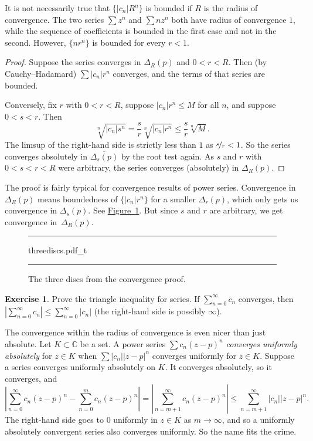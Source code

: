 \documentclass[12pt,openany]{book}
\newcommand{\sabs}[1]{\lvert {#1} \rvert}
\newcommand{\abs}[1]{\left\lvert {#1} \right\rvert}
\newcommand{\C}{{\mathbb{C}}}
\theoremstyle{plain}
\theoremstyle{remark}
\theoremstyle{definition}
\newenvironment{exbox}{%
    \def\FrameCommand{\vrule width 1pt \relax\hspace{10pt}}%
    \MakeFramed{\advance\hsize-\width\FrameRestore}%
}{%
    \endMakeFramed
}
\newenvironment{myfig}{%
\begin{figure}[h!t]
\noindent\rule{\textwidth}{0.5pt}\vspace{12pt}\par\centering}%
{\par\noindent\rule{\textwidth}{0.5pt}
\end{figure}}
\theoremstyle{exercise}
\newtheorem{exercise}{Exercise}[section]
\theoremstyle{example}
\newcommand{\figureref}[1]{\hyperref[#1]{Figure~\ref*{#1}}}
\begin{document}
It is not necessarily true that $\bigl\{ \sabs{c_n} R^n \bigr\}$
is bounded if $R$ is the radius of convergence.
The two series $\sum z^n$ and $\sum n z^n$ both have
radius of convergence $1$, while the sequence of coefficients
is bounded in the first case and
not in the second.  However, $\{ n r^n \}$ is bounded for every $r < 1$.

\begin{proof}
Suppose the series converges in $\Delta_{R}(p)$ and
$0 < r < R$.  Then (by Cauchy--Hadamard) $\sum \sabs{c_n}r^n$ converges,
and the terms of that series are bounded.

Conversely, fix $r$ with $0 < r < R$, suppose 
$\sabs{c_n} r^n \leq M$ for all $n$, and suppose $0 < s < r$.
Then
\begin{equation*}
\sqrt[n]{\sabs{c_n} s^n}=
\frac{s}{r}\sqrt[n]{\sabs{c_n} r^n} \leq \frac{s}{r} \sqrt[n]{M} .
\end{equation*}
The limsup of the right-hand side is strictly less than $1$
as $\nicefrac{s}{r} < 1$.
So the series converges absolutely in
$\overline{\Delta_s(p)}$ by the root test again.
As $s$ and $r$ with $0 < s < r < R$ were arbitrary,
the series converges (absolutely) in $\Delta_R(p)$.
\end{proof}

The proof is fairly typical for convergence results of power series.
Convergence in $\Delta_R(p)$ means boundedness of
$\{ \sabs{c_n} r^n \}$ for a smaller $\Delta_r(p)$, which only gets us convergence
in $\Delta_s(p)$.  See \figureref{fig:threediscs}.  But since $s$ and $r$
are arbitrary, we get convergence in~$\Delta_R(p)$.
\begin{myfig}
{threediscs.pdf_t}
\caption{The three discs from the convergence proof.\label{fig:threediscs}}
\end{myfig}

\begin{exbox}
\begin{exercise}
Prove the triangle inequality for series.  If $\sum_{n=0}^\infty c_n$
converges, then $\abs{\sum_{n=0}^\infty c_n} \leq \sum_{n=0}^\infty
\sabs{c_n}$ (the right-hand side is possibly $\infty$).
\end{exercise}
\end{exbox}

The convergence within the radius of convergence is even nicer than just absolute.
Let $K \subset \C$ be a set.
A power series $\sum c_n {(z-p)}^n$
\emph{converges uniformly absolutely}%
%
for $z \in K$ when $\sum \sabs{c_n} \sabs{z-p}^n$
converges uniformly for $z \in K$.
Suppose a series converges uniformly absolutely on $K$.  It converges absolutely,
so it converges, and 
\begin{equation*}
\abs{
\sum_{n=0}^\infty c_n {(z-p)}^n
-
\sum_{n=0}^{m} c_n {(z-p)}^n
}
=
\abs{\sum_{n=m+1}^\infty c_n {(z-p)}^n} \leq
\sum_{n=m+1}^\infty \sabs{c_n} \sabs{z-p}^n .
\end{equation*}
The right-hand side goes to $0$ uniformly in $z \in K$ as $m \to \infty$,
and so
a uniformly absolutely convergent series also converges
uniformly.  So the name fits the crime.
\end{document}
